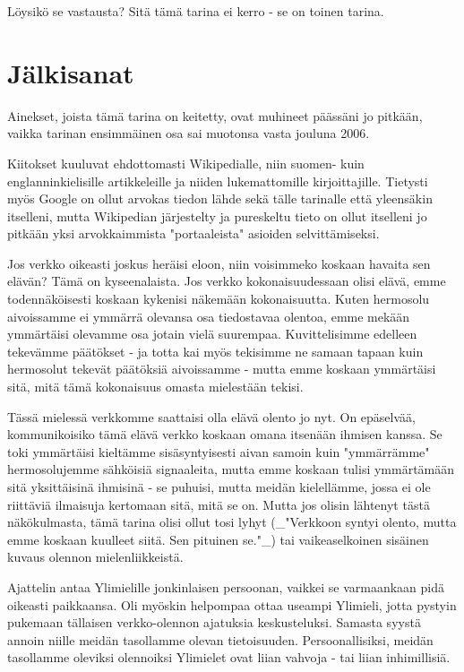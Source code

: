 Löysikö se vastausta? Sitä tämä tarina ei kerro - se on toinen tarina.







\chapter{Jälkisanat}Ainekset, joista tämä tarina on keitetty, ovat muhineet päässäni jo pitkään, vaikka tarinan ensimmäinen osa sai muotonsa vasta jouluna 2006.


Kiitokset kuuluvat ehdottomasti Wikipedialle, niin suomen- kuin englanninkielisille artikkeleille ja niiden lukemattomille kirjoittajille. Tietysti myös Google on ollut arvokas tiedon lähde sekä tälle tarinalle että yleensäkin itselleni, mutta Wikipedian järjestelty ja pureskeltu tieto on ollut itselleni jo pitkään yksi arvokkaimmista "portaaleista" asioiden selvittämiseksi.




\psep Jos verkko oikeasti joskus heräisi eloon, niin voisimmeko koskaan havaita sen elävän? Tämä on kyseenalaista. Jos verkko kokonaisuudessaan olisi elävä, emme todennäköisesti koskaan kykenisi näkemään kokonaisuutta. Kuten hermosolu aivoissamme ei ymmärrä olevansa osa tiedostavaa olentoa, emme mekään ymmärtäisi olevamme osa jotain vielä suurempaa. Kuvittelisimme edelleen tekevämme päätökset - ja totta kai myös tekisimme ne samaan tapaan kuin hermosolut tekevät päätöksiä aivoissamme - mutta emme koskaan ymmärtäisi sitä, mitä tämä kokonaisuus omasta mielestään tekisi.


Tässä mielessä verkkomme saattaisi olla elävä olento jo nyt. On epäselvää, kommunikoisiko tämä elävä verkko koskaan omana itsenään ihmisen kanssa. Se toki ymmärtäisi kieltämme sisäsyntyisesti aivan samoin kuin "ymmärrämme" hermosolujemme sähköisiä signaaleita, mutta emme koskaan tulisi ymmärtämään sitä yksittäisinä ihmisinä - se puhuisi, mutta meidän kielellämme, jossa ei ole riittäviä ilmaisuja kertomaan sitä, mitä se on. Mutta jos olisin lähtenyt tästä näkökulmasta, tämä tarina olisi ollut tosi lyhyt (_"Verkkoon syntyi olento, mutta emme koskaan kuulleet siitä. Sen pituinen se."_) tai vaikeaselkoinen sisäinen kuvaus olennon mielenliikkeistä.


Ajattelin antaa Ylimielille jonkinlaisen persoonan, vaikkei se varmaankaan pidä oikeasti paikkaansa. Oli myöskin helpompaa ottaa useampi Ylimieli, jotta pystyin pukemaan tällaisen verkko-olennon ajatuksia keskusteluksi. Samasta syystä annoin niille meidän tasollamme olevan tietoisuuden. Persoonallisiksi, meidän tasollamme oleviksi olennoiksi Ylimielet ovat liian vahvoja - tai liian inhimillisiä.




